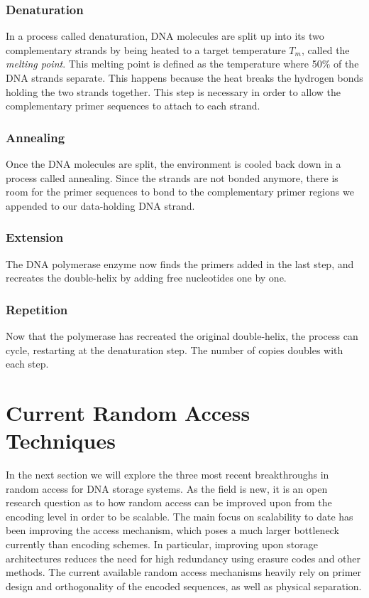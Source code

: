 \documentclass[a4paper,conference]{IEEEtran}
\begin{document}
\subsubsection{Denaturation}
In a process called denaturation, DNA molecules are split up into its two complementary strands by being heated to a target temperature $T_m$, called the \textit{melting point}. This melting point is defined as the temperature where 50\% of the DNA strands separate. This happens because the heat breaks the hydrogen bonds holding the two strands together. This step is necessary in order to allow the complementary primer sequences to attach to each strand. \\
\subsubsection{Annealing}
Once the DNA molecules are split, the environment is cooled back down in a process called annealing. Since the strands are not bonded anymore, there is room for the primer sequences to bond to the complementary primer regions we appended to our data-holding DNA strand.\\
\subsubsection{Extension}
The DNA polymerase enzyme now finds the primers added in the last step, and recreates the double-helix by adding free nucleotides one by one.\\
\subsubsection{Repetition}
Now that the polymerase has recreated the original double-helix, the process can cycle, restarting at the denaturation step. The number of copies doubles with each step.\\

\section{Current Random Access Techniques}
In the next section we will explore the three most recent breakthroughs in random access for DNA storage systems. As the field is new, it is an open research question as to how random access can be improved upon from the encoding level in order to be scalable. The main focus on scalability to date has been improving the access mechanism, which poses a much larger bottleneck currently than encoding schemes. In particular, improving upon storage architectures reduces the need for high redundancy using erasure codes and other methods. The current available random access mechanisms heavily rely on primer design and orthogonality of the encoded sequences, as well as physical separation.
\end{document}
